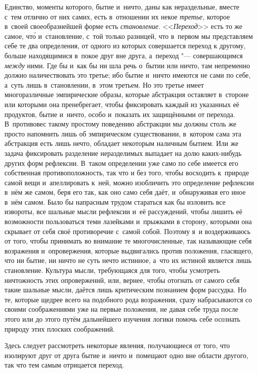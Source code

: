 Единство, моменты которого, бытие и~ничто, даны как нераздельные, вместе с~тем
отлично от них самих, есть в~отношении их некое {\em третье,} которое в~своей
своеобразнейшей форме есть {\em становление}. <<{\em Переход}>> есть то же
самое, чт\'{о} и~становление, с~той только разницей, что в~первом мы
представляем себе те два определения, от одного из которых совершается переход
к другому, больше находящимися в~покое друг вне друга, а~переход "---
совершающимся {\em между} ними. Где бы и~как бы ни шла речь о~бытии или ничто,
там непременно должно наличествовать это третье; ибо бытие и~ничто имеются не
сами по себе, а~суть лишь в~становлении, в~этом третьем. Но это третье имеет
многоразличные эмпирические образы, которые абстракция оставляет в~стороне или
которыми она пренебрегает, чтобы фиксировать каждый из указанных её продуктов,
бытие и~ничто, особо и~показать их защищёнными от перехода. В~противовес такому
простому поведению абстракции мы должны столь же просто напомнить лишь об
эмпирическом существовании, в~котором сама эта абстракция есть лишь нечто,
обладает некоторым наличным бытием. Или же задача фиксировать разделение
неразделимых выпадает на долю каких-нибудь других форм рефлексии. В~таком
определении уже само по себе имеется его собственная противоположность, так что
и без того, чтобы восходить к~природе самой вещи и~апеллировать к~ней, можно
изобличить это определение рефлексии в~нём же самом, беря его так, как оно само
себя даёт, и~обнаруживая его иное в~нём самом. Было бы напрасным трудом
стараться как бы изловить все извороты, все шальные мысли рефлексии и~её
рассуждений, чтобы лишить её возможности пользоваться теми лазейками и~прыжками
в сторону, которыми она скрывает от себя своё противоречие с~самой собой.
Поэтому я~и воздерживаюсь от того, чтобы принимать во внимание те
многочисленные, так называющие себя возражения и~опровержения, которые
выдвигались против положения, гласящего, что ни бытие, ни ничто не суть нечто
истинное, а~что их истиной является лишь становление. Культура мысли,
требующаяся для того, чтобы усмотреть ничтожность этих опровержений, или,
вернее, чтобы отогнать от самого себя такие шальные мысли, даётся лишь
критическим познанием форм рассудка. Но те, которые щедрее всего на подобного
рода возражения, сразу набрасываются со своими соображениями уже на первые
положения, не давая себе труда после этого или до этого путём дальнейшего
изучения логики помочь себе осознать природу этих плоских соображений.

Здесь следует рассмотреть некоторые явления, получающиеся от того, что
изолируют друг от друга бытие и~ничто и~помещают одно вне области другого,
так что тем самым отрицается переход.


